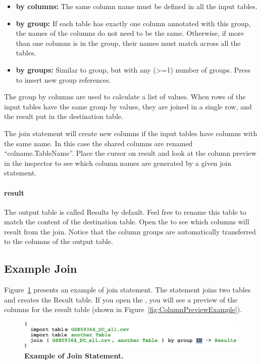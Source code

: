 \begin{itemize}
	\item \textbf{by columns:} The same column name must be defined in all the input tables.
	\item \textbf{by group:} If each table has exactly one column annotated with this group, the names of the columns do not need to be the same. Otherwise, if more than one columns is in the group, their names must match across all the tables. 
	\item \textbf{by groups:} Similar to group, but with any (>=1) number of groups. Press \keys{\return} to insert new group references.
\end{itemize}
 The group by columns are used to calculate a list of values. When rows of the input tables have the same group by values, they are joined in a single row, and the result put in the destination table. 

\begin{remark}
The join statement will create new columns if the input tables have columns with the same name. In this case the shared columns are renamed ``colname.TableName''. Place the cursor on result and look at the column preview in the inspector to see which column names are generated by a given join statement.
\end{remark}

\paragraph{result}
The output table is called Results by default. Feel free to rename this table to match the content of the destination table. Open the \inspectorTabIcon{} to see which columns will result from the join. Notice that the column groups are automatically transferred to the columns of the output table.


\subsection{Example Join}
Figure~\ref{fig:ExampleJoinStatement} presents an example of join statement. The statement joins two tables and creates the Result table. If you open the \inspectorTabIcon{}, you will see a preview of the columns for the result table (shown in Figure~\ref{fig:ColumnPreviewExample}). 
\begin{figure}
  \centering
  \includegraphics[width=\figWidthNarrow]{figures/ExampleJoin.pdf}
\caption[Example of Join Statement.]{\textbf{Example of Join Statement.}}
\label{fig:ExampleJoinStatement}
\end{figure}


